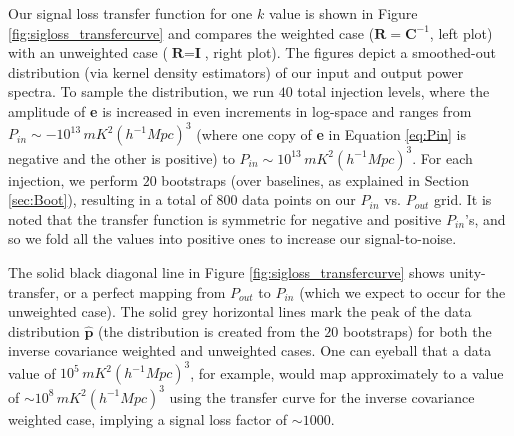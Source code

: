 \documentclass[preprint2,numberedappendix,tighten]{aastex6}  %
\begin{document}
Our signal loss transfer function for one $k$ value is shown in Figure \ref{fig:sigloss_transfercurve} and compares the weighted case ($\textbf{R} = \textbf{C}^{-1}$, left plot) with an unweighted case ($\textbf{R} = \textbf{I}$, right plot). The figures depict a smoothed-out distribution (via kernel density estimators) of our input and output power spectra. To sample the distribution, we run $40$ total injection levels, where the amplitude of \textbf{e} is increased in even increments in log-space and ranges from $P_{in} \sim -10^{13} \, mK^{2} (h^{-1} Mpc)^{3}$ (where one copy of \textbf{e} in Equation \eqref{eq:Pin} is negative and the other is positive) to $P_{in} \sim10^{13} \, mK^{2} (h^{-1} Mpc)^{3}$. For each injection, we perform $20$ bootstraps (over baselines, as explained in Section \ref{sec:Boot}), resulting in a total of $800$ data points on our $P_{in}$ vs. $P_{out}$ grid. It is noted that the transfer function is symmetric for negative and positive $P_{in}$'s, and so we fold all the values into positive ones to increase our signal-to-noise.

The solid black diagonal line in Figure \ref{fig:sigloss_transfercurve} shows unity-transfer, or a perfect mapping from $P_{out}$ to $P_{in}$ (which we expect to occur for the unweighted case). The solid grey horizontal lines mark the peak of the data distribution $\hat{\textbf{p}}$ (the distribution is created from the $20$ bootstraps) for both the inverse covariance weighted and unweighted cases. One can eyeball that a data value of $10^{5} \, mK^{2} (h^{-1} Mpc)^{3}$, for example, would map approximately to a value of $\sim10^{8} \, mK^{2} (h^{-1} Mpc)^{3}$ using the transfer curve for the inverse covariance weighted case, implying a signal loss factor of $\sim1000$. 
\end{document}
